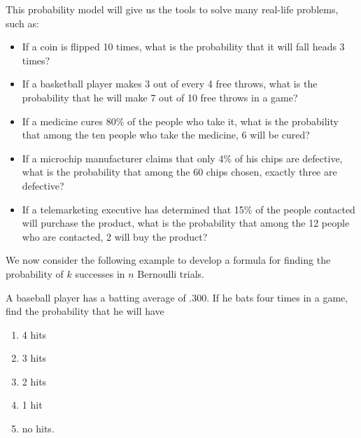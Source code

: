 This probability model will give us the tools to solve many real-life problems, such as:
\begin{itemize}
    \item If a coin is flipped 10 times, what is the probability that it will fall heads 3 times?
    \item If a basketball player makes 3 out of every 4 free throws, what is the probability that he will make 7 out of 10 free throws in a game?
    \item If a medicine cures 80\% of the people who take it, what is the probability that among the ten people who take the medicine, 6 will be cured?
    \item If a microchip manufacturer claims that only 4\% of his chips are defective, what is the probability that among the 60 chips chosen, exactly three are defective?
    \item If a telemarketing executive has determined that 15\% of the people contacted will purchase the product, what is the probability that among the 12 people who are contacted, 2 will buy the product?
\end{itemize}

We now consider the following example to develop a formula for finding the probability of $k$ successes in $n$ Bernoulli trials.

\begin{example}
    A baseball player has a batting average of .300. If he bats four times in a game, find the probability that he will have
    \begin{enumerate}
        \item 4 hits
        \item 3 hits
        \item 2 hits
        \item 1 hit
        \item no hits.
    \end{enumerate}
\end{example}

